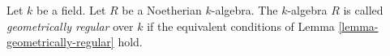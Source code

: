 \begin{definition}
\label{definition-geometrically-regular}
Let $k$ be a field. Let $R$ be a Noetherian $k$-algebra.
The $k$-algebra $R$ is called {\it geometrically regular} over $k$ if
the equivalent conditions of Lemma \ref{lemma-geometrically-regular} hold.
\end{definition}